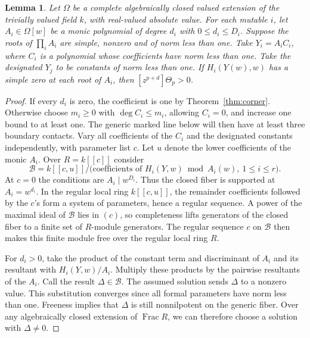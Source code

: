\documentclass[11pt,reqno]{amsart}
\numberwithin{equation}{section}
\newtheorem{lemma}[theorem]{Lemma}
\theoremstyle{definition}
\theoremstyle{remark}
\DeclareMathOperator{\Frac}{Frac}
\begin{document}
\begin{lemma}\label{lem:polynomial-contact-coefficient}
Let \(\Omega\) be a complete algebraically closed valued extension of
the trivially valued field \(k\), with real-valued absolute value.
For each mutable \(i\), let \(A_i\in\Omega[w]\) be a monic polynomial
of degree \(d_i\) with \(0\le d_i\le D_i\). Suppose the roots of
\(\prod_i A_i\) are simple, nonzero and of norm less than one.
Take \(Y_i=A_i C_i\), where \(C_i\) is a polynomial whose coefficients
have norm less than one. Take the designated \(Y_j\) to be constants
of norm less than one. If \(H_i(Y(w),w)\) has a simple zero at each
root of \(A_i\), then \([z^{p+d}]\Theta_p>0\).
\end{lemma}

\begin{proof}
If every \(d_i\) is zero, the coefficient is one by
Theorem~\ref{thm:corner}. Otherwise choose \(m_i\ge0\) with
\(\deg C_i\le m_i\), allowing \(C_i=0\), and increase one bound to
at least one. The generic marked line below will then have at least
three boundary contacts.
Vary all coefficients of the \(C_i\) and the designated constants
independently, with parameter list \(c\). Let \(u\) denote the lower
coefficients of the monic \(A_i\). Over \(R=k[[c]]\) consider
\[ \mathcal B=k[[c,u]]/ \bigl(\text{coefficients of }H_i(Y,w)\bmod A_i(w),\ 1\le i\le r\bigr). \]
At \(c=0\) the conditions are \(A_i\mid w^{D_i}\). Thus the closed
fiber is supported at \(A_i=w^{d_i}\). In the regular local ring
\(k[[c,u]]\), the remainder coefficients followed by the \(c\)'s
form a system of parameters, hence a regular sequence. A power of
the maximal ideal of \(\mathcal B\) lies in \((c)\), so completeness
lifts generators of the closed fiber to a finite set of \(R\)-module
generators. The regular sequence \(c\) on \(\mathcal B\) then makes
this finite module free over the regular local ring \(R\).

For \(d_i>0\), take the product of the constant term and discriminant
of \(A_i\) and its resultant with \(H_i(Y,w)/A_i\). Multiply these
products by the pairwise resultants of the \(A_i\). Call the result
\(\Delta\in\mathcal B\). The assumed solution sends \(\Delta\) to a
nonzero value. This substitution converges since all formal parameters
have norm less than one. Freeness implies that \(\Delta\) is still
nonnilpotent on the generic fiber. Over any algebraically closed
extension of \(\Frac R\), we can therefore choose a solution with
\(\Delta\ne0\).


\end{proof}
\end{document}

